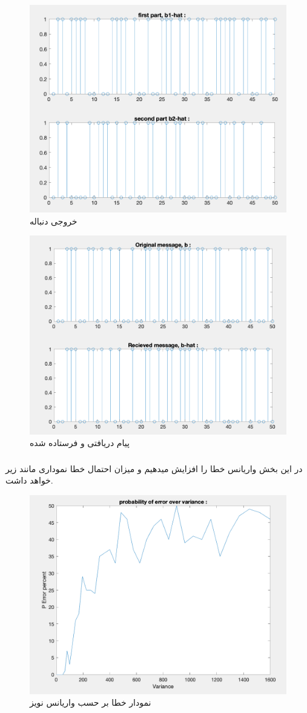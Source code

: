 \documentclass[10pt]{article}
\begin{document}
	\begin{figure}[h]
		\centering
		\includegraphics[width=0.5\linewidth]{../img/3.1.7}
		\caption{خروجی دنباله 
		}
		\label{fig:3-1-7}
	\end{figure}

	\begin{figure}[h]
		\centering
		\includegraphics[width=0.7\linewidth]{../img/3.1.8}
		\caption{پیام دریافتی و فرستاده شده}
		\label{fig:3-1-8}
	\end{figure}
	
	
	
	\newpage
	\subsubsection{ }
	در این بخش واریانس خطا را افزایش میدهیم و میزان احتمال خطا نموداری مانند زیر خواهد داشت.
	\begin{figure}[H]
		\centering
		\includegraphics[width=0.6\linewidth]{../img/3.1.10}
		\caption{نمودار خطا بر حسب واریانس نویز}
		\label{fig:3-1-10}
	\end{figure}
\end{document}
